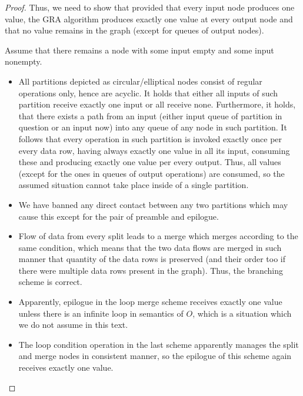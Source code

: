   \begin{proof} 
    Thus, we need to show that provided that every input node produces one value, the GRA algorithm produces exactly one value at every output node and that no value remains in the graph (except for queues of output nodes).

        Assume that there remains a node with some input empty and some input nonempty. 
        \begin{itemize}
          \item All partitions depicted as circular/elliptical nodes consist of regular operations only, hence are acyclic. It holds that either all inputs of such partition receive exactly one input or all receive none. Furthermore, it holds, that there exists a path from an input (either input queue of partition in question or an input now) into any queue of any node in such partition. It follows that every operation in such partition is invoked exactly once per every data row, having always exactly one value in all its input, consuming these and producing exactly one value per every output. Thus, all values (except for the ones in queues of output operations) are consumed, so the assumed situation cannot take place inside of a single partition.  
          \item We have banned any direct contact between any two partitions which may cause this except for the pair of preamble and epilogue.
          \item Flow of data from every split leads to a merge which merges according to the same condition, which means that the two data flows are merged in such manner that quantity of the data rows is preserved (and their order too if there were multiple data rows present in the graph). Thus, the branching scheme is correct.
          \item Apparently, epilogue in the loop merge scheme receives exactly one value unless there is an infinite loop in semantics of $O$, which is a situation which we do not assume in this text.
          \item The loop condition operation in the last scheme apparently manages the split and merge nodes in consistent manner, so the epilogue of this scheme again receives exactly one value.
        \end{itemize}

  \end{proof}
\myendobs

